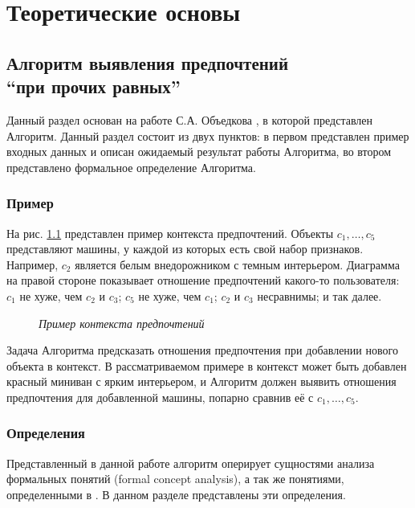 \chapter{Теоретические основы}
\label{chapter:theory}

	
\section[Алгоритм выявления предпочтений \enquote{при прочих равных}]{ Алгоритм выявления предпочтений \\ \enquote{при прочих равных}}

	Данный раздел основан на работе С.А. Объедкова \cite{Obiedkov:2013}, в которой представлен Алгоритм. Данный раздел состоит из двух пунктов: в первом представлен пример входных данных и описан ожидаемый результат работы Алгоритма, во втором представлено формальное определение Алгоритма.
	
	\subsection{Пример}
	\label{subsection:example}
		На рис. \ref{fig:pcxt} представлен пример контекста предпочтений. Объекты $c_1, \dotsc, c_5$ представляют машины, у каждой из которых есть свой набор признаков. Например, $c_2$ является белым внедорожником с темным интерьером. Диаграмма на правой стороне показывает отношение предпочтений какого-то пользователя: $c_1$ не хуже, чем $c_2$ и $c_3$; $c_5$ не хуже, чем $c_1$; $c_2$ и $c_3$ несравнимы; и так далее. 
		\begin{figure}
			\begin{center} 
				\cars \prefs
				\caption{\it Пример контекста предпочтений \cite[Рис.~1.1]{Obiedkov:2013}}
				\label{fig:pcxt}	
			\end{center} 
		\end{figure} 
		
		Задача Алгоритма предсказать отношения предпочтения при добавлении нового объекта в контекст. В рассматриваемом примере в контекст может быть добавлен красный миниван с ярким интерьером, и Алгоритм должен выявить отношения предпочтения для добавленной машины, попарно сравнив её с $c_1, \dotsc, c_5$. 
	
	\subsection{Определения}
	\label{subsection:definitions}
		Представленный в данной работе алгоритм оперирует сущностями анализа формальных понятий (formal concept analysis)\cite{Ganter:1999}, а так же понятиями, определенными в \cite{Obiedkov:2012:preferences,Obiedkov:2012:modeling}. В данном разделе представлены эти определения.
		
